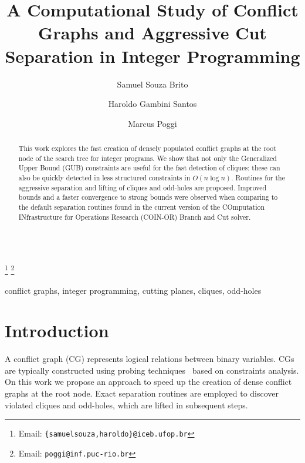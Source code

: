 \documentclass{endm}
\begin{document}
  

\begin{verbatim}\end{verbatim}\vspace{2.5cm}

\begin{frontmatter}

\title{A Computational Study of Conflict Graphs and Aggressive Cut Separation in Integer Programming}
\author{Samuel Souza Brito \and Haroldo Gambini Santos}
\address{{\small Dep. de Computação, Universidade Federal de Ouro Preto - UFOP}}
\author{Marcus Poggi}
\address{{\small Dep. de Informática, Pontifícia Universidade Católica do Rio de Janeiro}}
\thanks[mailSamuelHaroldo]{Email: {\texttt{\normalshape \{samuelsouza,haroldo\}@iceb.ufop.br}}} 
\thanks[mailPoggi]{Email: {\texttt{\normalshape poggi@inf.puc-rio.br}}}  

\begin{abstract}
This work explores the fast creation of densely populated conflict graphs at the root node of the search tree for integer programs. We show that not only the Generalized Upper Bound (GUB) constraints are useful for the fast detection of cliques: these can also be quickly detected in less structured constraints in $O( n \log n )$. Routines for the aggressive separation and lifting of cliques and odd-holes are proposed. Improved bounds and a faster convergence to strong bounds were observed when comparing to the default separation routines found in the current version of the COmputation INfrastructure for Operations Research (COIN-OR) Branch and Cut solver.
\end{abstract}

\begin{keyword}
conflict graphs, integer programming, cutting planes, cliques, odd-holes
\end{keyword}

\end{frontmatter}


\section{Introduction}\label{intro}

A conflict graph (CG) represents logical relations between binary variables. CGs are typically constructed using probing techniques~\cite{Savelsbergh1994} based on constraints analysis. On this work we propose an approach to speed up the creation of dense conflict graphs at the root node. Exact separation routines are employed to discover violated cliques and odd-holes, which are lifted in subsequent steps.
\end{document}
